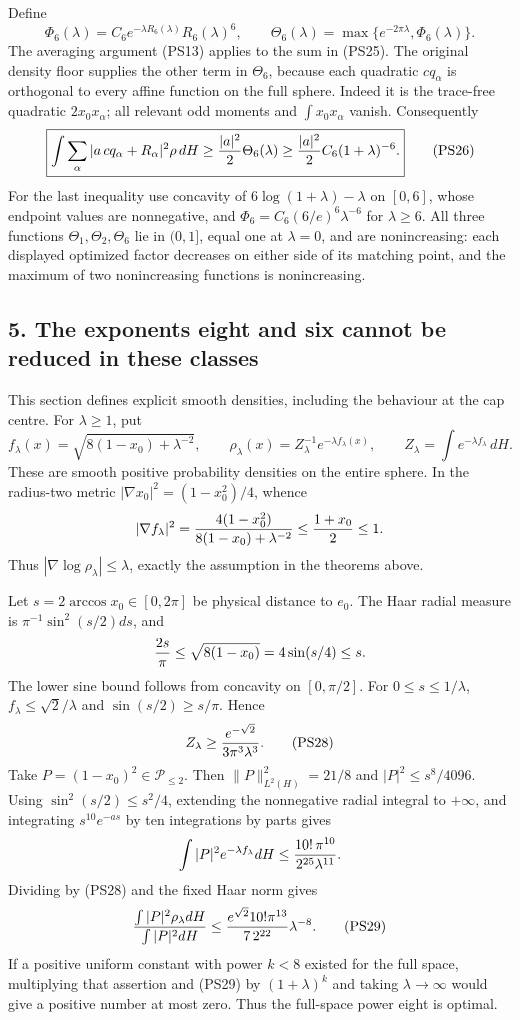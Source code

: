 \documentclass[11pt]{article}
\begin{document}
Define
\[
 \Phi_6(\lambda)=C_6e^{-\lambda R_6(\lambda)}R_6(\lambda)^6,
 \qquad
 \Theta_6(\lambda)=\max\{e^{-2\pi\lambda},\Phi_6(\lambda)\}.
 \]
The averaging argument (PS13) applies to the sum in (PS25).
The original density floor supplies the other term in \(\Theta_6\),
because each quadratic \(cq_\alpha\) is orthogonal to every affine
function on the full sphere. Indeed it is the trace-free quadratic
\(2x_0x_\alpha\); all relevant odd moments and
\(\int x_0x_\alpha\) vanish. Consequently
\[
 \boxed{\int\sum_\alpha|a\,cq_\alpha+R_\alpha|^2\rho\,dH
   \ge {|a|^2\over2}\Theta_6(\lambda)
   \ge {|a|^2\over2}C_6(1+\lambda)^{-6}.}
 \tag{PS26}
\]
For the last inequality use concavity of
\(6\log(1+\lambda)-\lambda\) on \([0,6]\), whose endpoint values
are nonnegative, and \(\Phi_6=C_6(6/e)^6\lambda^{-6}\)
for \(\lambda\ge6\). All three functions
\(\Theta_1,\Theta_2,\Theta_6\) lie in \((0,1]\), equal one at
\(\lambda=0\), and are nonincreasing: each displayed optimized
factor decreases on either side of its matching point, and the
maximum of two nonincreasing functions is nonincreasing.

\subsection*{5. The exponents eight and six cannot be reduced in these classes}

This section defines explicit smooth densities, including the
behaviour at the cap centre. For \(\lambda\ge1\), put
\[
 f_\lambda(x)=\sqrt{8(1-x_0)+\lambda^{-2}},\qquad
 \rho_\lambda(x)=Z_\lambda^{-1}e^{-\lambda f_\lambda(x)},\qquad
 Z_\lambda=\int e^{-\lambda f_\lambda}\,dH.
 \tag{PS27}
\]
These are smooth positive probability densities on the entire
sphere. In the radius-two metric
\(\lvert\nabla x_0\rvert^2=(1-x_0^2)/4\), whence
\[
 |\nabla f_\lambda|^2
 ={4(1-x_0^2)\over8(1-x_0)+\lambda^{-2}}
 \le{1+x_0\over2}\le1.
 \]
Thus \(|\nabla\log\rho_\lambda|\le\lambda\), exactly the
assumption in the theorems above.

Let \(s=2\arccos x_0\in[0,2\pi]\) be physical distance to \(e_0\).
The Haar radial measure is \(\pi^{-1}\sin^2(s/2)ds\), and
\[
 {2s\over\pi}\le\sqrt{8(1-x_0)}=4\sin(s/4)\le s.
 \]
The lower sine bound follows from concavity on \([0,\pi/2]\).
For \(0\le s\le1/\lambda\), \(f_\lambda\le\sqrt2/\lambda\)
and \(\sin(s/2)\ge s/\pi\). Hence
\[
 Z_\lambda\ge {e^{-\sqrt2}\over3\pi^3\lambda^3}.
 \tag{PS28}
\]
Take \(P=(1-x_0)^2\in\mathcal P_{\le2}\). Then
\(\|P\|_{L^2(H)}^2=21/8\) and
\(|P|^2\le s^8/4096\). Using
\(\sin^2(s/2)\le s^2/4\), extending the nonnegative radial integral
to \(+\infty\), and integrating \(s^{10}e^{-as}\) by ten
integrations by parts gives
\[
 \int |P|^2e^{-\lambda f_\lambda}dH
 \le {10!\,\pi^{10}\over2^{25}\lambda^{11}}.
 \]
Dividing by (PS28) and the fixed Haar norm gives
\[
 {\int|P|^2\rho_\lambda dH\over\int|P|^2dH}
 \le {e^{\sqrt2}10!\pi^{13}\over7\,2^{22}}\lambda^{-8}.
 \tag{PS29}
\]
If a positive uniform constant with power \(k<8\) existed for
the full space, multiplying that assertion and (PS29) by
\((1+\lambda)^k\) and taking \(\lambda\to\infty\) would give
a positive number at most zero. Thus the full-space power eight
is optimal.
\end{document}
